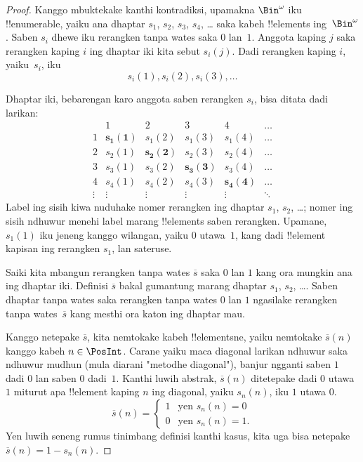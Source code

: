 \documentclass[../../../include/open-logic-section]{subfiles}
\begin{document}
\begin{proof}
Kanggo mbuktekake kanthi kontradiksi, upamakna $\Bin^\omega$ iku
!!{enumerable}, yaiku ana dhaptar $s_{1}$, $s_{2}$,
$s_{3}$, $s_{4}$, \dots{} saka kabeh !!{element}s ing~$\Bin^\omega$.
Saben $s_i$ dhewe iku rerangken tanpa wates saka $0$ lan~$1$.
Anggota kaping $j$ saka rerangken kaping $i$ ing dhaptar iki kita sebut
$s_i(j)$. Dadi rerangken kaping $i$, yaiku~$s_i$, iku
\[
s_i(1), s_i(2), s_i(3), \dots
\]

Dhaptar iki, bebarengan karo anggota saben rerangken $s_i$,
bisa ditata dadi larikan:
\[
\begin{array}{c|c|c|c|c|c}
& 1 & 2 & 3 & 4 & \dots \\\hline
1 & \mathbf{s_{1}(1)} & s_{1}(2) & s_{1}(3) & s_1(4) & \dots \\\hline
2 & s_{2}(1)& \mathbf{s_{2}(2)} & s_2(3) & s_2(4) & \dots \\\hline
3 & s_{3}(1)& s_{3}(2) & \mathbf{s_3(3)} & s_3(4) & \dots \\\hline
4 & s_{4}(1)& s_{4}(2) & s_4(3) & \mathbf{s_4(4)} & \dots \\\hline
\vdots & \vdots & \vdots & \vdots & \vdots & \mathbf{\ddots}
\end{array}
\]
Label ing sisih kiwa nuduhake nomer rerangken ing dhaptar
$s_1$, $s_2$, \dots; nomer ing sisih ndhuwur menehi label marang
!!{element}s saben rerangken. Upamane, $s_{1}(1)$ iku jeneng
kanggo wilangan, yaiku $0$ utawa~$1$, kang dadi !!{element} kapisan
ing rerangken $s_{1}$, lan sateruse.

Saiki kita mbangun rerangken tanpa wates $\overline{s}$ saka $0$ lan
$1$ kang ora mungkin ana ing dhaptar iki. Definisi
$\overline{s}$ bakal gumantung marang dhaptar $s_1$, $s_2$, \dots.
Saben dhaptar tanpa wates saka rerangken tanpa wates $0$ lan $1$
ngasilake rerangken tanpa wates~$\overline{s}$ kang mesthi ora katon
ing dhaptar mau.

Kanggo netepake $\overline{s}$, kita nemtokake kabeh !!{element}sne,
yaiku nemtokake $\overline{s}(n)$ kanggo kabeh $n \in \PosInt$.
Carane yaiku maca diagonal larikan ndhuwur saka ndhuwur mudhun
(mula diarani "metodhe diagonal"), banjur ngganti saben $1$
dadi $0$ lan saben $0$ dadi~$1$. Kanthi luwih abstrak,
$\overline{s}(n)$ ditetepake dadi $0$ utawa $1$ miturut apa
!!{element} kaping $n$ ing diagonal, yaiku $s_n(n)$, iku $1$ utawa $0$.
\[
\overline{s}(n) =
\begin{cases}
1 & \text{yen $s_{n}(n) = 0$}\\
0 & \text{yen $s_{n}(n) = 1$}.
\end{cases}
\]
Yen luwih seneng rumus tinimbang definisi kanthi kasus,
kita uga bisa netepake $\overline{s}(n) = 1 - s_n(n)$.


\end{proof}
\end{document}
